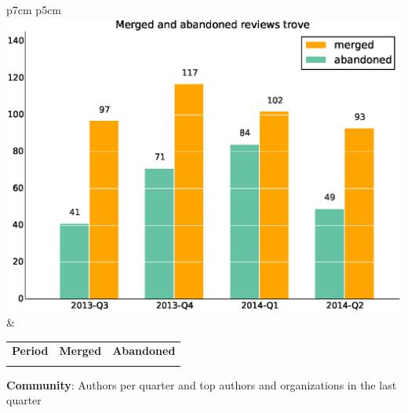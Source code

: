 \documentclass[a4wide,11pt]{report}
\begin{document}
\begin{tabular}{p{7cm} p{5cm}}
    \vspace{0pt} 
    \includegraphics[scale=.35]{figs/submitted_reviewstrove.eps}
    & 
    \vspace{0pt}
    \begin{tabular}{l|r|r|}%
    \bfseries Period & \bfseries Merged & \bfseries Abandoned %
    \csvreader[head to column names]{data/submitted_reviewstrove.csv}{}%
    {\\ & \merged & \abandoned}
    \end{tabular}
\end{tabular}

\textbf{Community}: Authors per quarter and top authors and organizations in the last quarter
\end{document}
